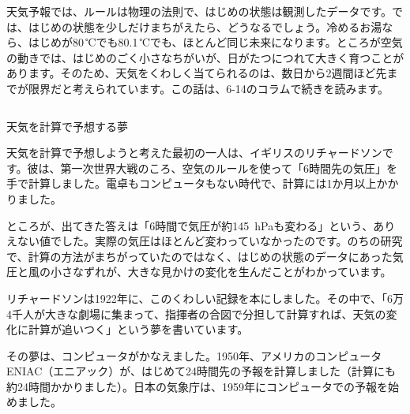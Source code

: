 天気予報では、ルールは物理の法則で、はじめの状態は観測したデータです。では、はじめの状態を少しだけまちがえたら、どうなるでしょう。冷めるお湯なら、はじめが80\,℃でも80.1\,℃でも、ほとんど同じ未来になります。ところが空気の動きでは、はじめのごく小さなちがいが、日がたつにつれて大きく育つことがあります。そのため、天気をくわしく当てられるのは、数日から2週間ほど先までが限界だと考えられています。この話は、6-14のコラムで続きを読みます。

\begin{column}{天気を計算で予想する夢}
\noindent\begin{minipage}[t]{0.53\linewidth}
天気を計算で予想しようと考えた最初の一人は、イギリスのリチャードソンです。彼は、第一次世界大戦のころ、空気のルールを使って「6時間先の気圧」を手で計算しました。電卓もコンピュータもない時代で、計算には1か月以上かかりました。

ところが、出てきた答えは「6時間で気圧が約\qty{145}{hPa}も変わる」という、ありえない値でした。実際の気圧はほとんど変わっていなかったのです。のちの研究で、計算の方法がまちがっていたのではなく、はじめの状態のデータにあった気圧と風の小さなずれが、大きな見かけの変化を生んだことがわかっています。
\end{minipage}\hfill
\begin{minipage}[t]{0.43\linewidth}
リチャードソンは1922年に、このくわしい記録を本にしました。その中で、「6万4千人が大きな劇場に集まって、指揮者の合図で分担して計算すれば、天気の変化に計算が追いつく」という夢を書いています。

その夢は、コンピュータがかなえました。1950年、アメリカのコンピュータENIAC（エニアック）が、はじめて24時間先の予報を計算しました（計算にも約24時間かかりました）。日本の気象庁は、1959年にコンピュータでの予報を始めました。
\end{minipage}
\par\vspace{4pt}
{\centering
{}\par}
\end{column}

